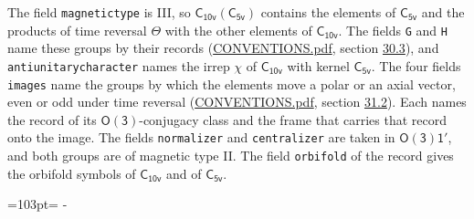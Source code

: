 \documentclass[10pt,a4paper]{article}
\newcommand{\needspace}[1]{\par\penalty-100\begingroup\dimen0=#1\relax\dimen2=\pagegoal
  \advance\dimen2-\pagetotal\ifdim\dimen0>\dimen2\relax\ifdim\dimen2>0pt\vfil\break\fi\fi
  \endgroup}
\numberwithin{equation}{section}
\newcommand{\grp}[1]{\mathsf{#1}}
\begin{document}
The field \texttt{magnetictype} is III, so $\grp{C_{10v}}(\grp{C_{5v}})$ contains the elements of $\grp{C_{5v}}$ and the products of time reversal $\varTheta$ with the other elements of $\grp{C_{10v}}$. The fields \texttt{G} and \texttt{H} name these groups by their records (\href{../../CONVENTIONS.pdf}{CONVENTIONS.pdf}, section \href{../../CONVENTIONS.pdf\#conv.30.3}{30.3}), and \texttt{antiunitarycharacter} names the irrep $\chi$ of $\grp{C_{10v}}$ with kernel $\grp{C_{5v}}$. The four fields \texttt{images} name the groups by which the elements move a polar or an axial vector, even or odd under time reversal (\href{../../CONVENTIONS.pdf}{CONVENTIONS.pdf}, section \href{../../CONVENTIONS.pdf\#conv.31.2}{31.2}). Each names the record of its $\grp{O(3)}$-conjugacy class and the frame that carries that record onto the image. The fields \texttt{normalizer} and \texttt{centralizer} are taken in $\grp{O(3)1'}$, and both groups are of magnetic type II. The field \texttt{orbifold} of the record gives the orbifold symbols of $\grp{C_{10v}}$ and of $\grp{C_{5v}}$.
\needspace{103pt}
\end{document}
